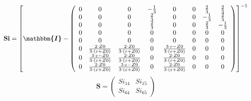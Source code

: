 \[ \mathbf{Si} = \left[ \boldsymbol{\mathbbm{I}}  -
\left(\begin{array}{cccccccc} 0 & 0 & 0 & -\frac{1}{3} & 0 & 0 &
\frac{2}{3} & \frac{2}{3} \\ 0 & 0 & 0 & \frac{2}{3} & 0 & 0 &
-\frac{1}{3} & \frac{2}{3} \\ 0 & 0 & 0 & \frac{2}{3} & 0 & 0 &
\frac{2}{3} & -\frac{1}{3} \\ 0 & 0 & 0 & 0 & 0 & 0 & 0 & 0 \\ 0 & 0 &
0 & 0 & 0 & 0 & 0 & 0 \\ 0 & \frac{2\cdot Z0}{3\cdot
\left(\varepsilon+Z0\right)} & \frac{2\cdot Z0}{3\cdot
\left(\varepsilon+Z0\right)} & 0 & \frac{3\cdot \varepsilon-Z0}{3\cdot
\left(\varepsilon+Z0\right)} & 0 & 0 & 0 \\ 0 & \frac{3\cdot
\varepsilon-Z0}{3\cdot \left(\varepsilon+Z0\right)} & \frac{2\cdot
Z0}{3\cdot \left(\varepsilon+Z0\right)} & 0 & \frac{2\cdot Z0}{3\cdot
\left(\varepsilon+Z0\right)} & 0 & 0 & 0 \\ 0 & \frac{2\cdot
Z0}{3\cdot \left(\varepsilon+Z0\right)} & \frac{3\cdot
\varepsilon-Z0}{3\cdot \left(\varepsilon+Z0\right)} & 0 & \frac{2\cdot
Z0}{3\cdot \left(\varepsilon+Z0\right)} & 0 & 0 & 0 \end{array}\right)
\right]^{-1} \]
\[ \mathbf{S} = \left(\begin{array}{cc} Si_{14} & Si_{15} \\ Si_{64} &
Si_{65} \end{array}\right) \]
